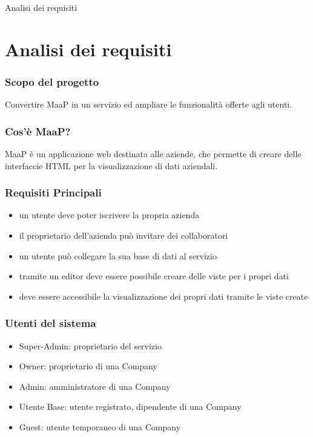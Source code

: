 \begin{frame}

\begin{center}
    \huge Analisi dei requisiti
\end{center}

\end{frame}

\section{Analisi dei requisiti}
\begin{frame}
  \frametitle{Scopo del progetto}

  \begin{center}
    Convertire MaaP in un servizio ed ampliare le funzionalità offerte agli utenti.
  \end{center}
\end{frame}

\begin{frame}
  \frametitle{Cos'è MaaP?}

  MaaP è un applicazione web destinata alle aziende, che permette di creare delle interfaccie HTML per la visualizzazione di dati aziendali.

\end{frame}

\begin{frame}
  \frametitle{Requisiti Principali}

  \begin{itemize}
  \item un utente deve poter iscrivere la propria azienda
  \item il proprietario dell'azienda può invitare dei collaboratori
  \item un utente può collegare la sua base di dati al servizio
  \item tramite un editor deve essere possibile creare delle viste per i propri dati
  \item deve essere accessibile la visualizzazione dei propri dati tramite le viste create
  \end{itemize}
\end{frame}


\begin{frame}
  \frametitle{Utenti del sistema}

  \begin{itemize}
  \item Super-Admin: proprietario del servizio
  \item Owner: proprietario di una Company
  \item Admin: amministratore di una Company
  \item Utente Base: utente registrato, dipendente di una Company
  \item Guest: utente temporaneo di una Company
  \end{itemize}

\end{frame}

